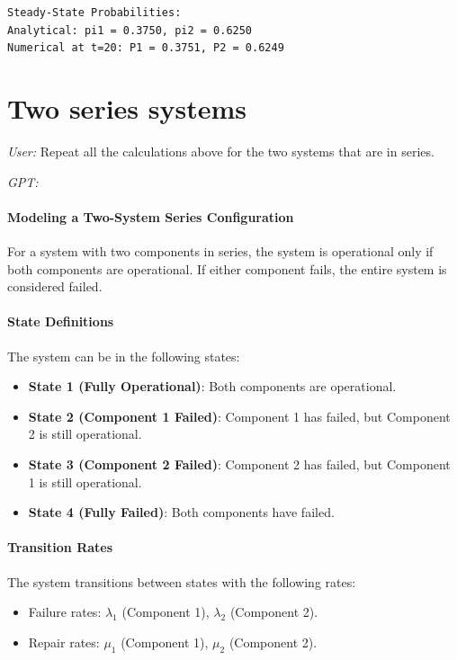 \documentclass[a4paper,12pt]{article}
\begin{document}
	

\texttt{Steady-State Probabilities:}\\
\texttt{Analytical: pi1 = 0.3750, pi2 = 0.6250}\\
\texttt{Numerical at t=20: P1 = 0.3751, P2 = 0.6249}

	
	\section{Two series systems}
	\begin{questionbox}
		\textit{User:} Repeat all the calculations above for the two systems that are in series.
	\end{questionbox}
	
	
	\begin{answerbox}
		\textit{GPT:} 
		
		\paragraph{Modeling a Two-System Series Configuration}
		For a system with two components in series, the system is operational only if both components are operational. If either component fails, the entire system is considered failed.
		
		\paragraph{State Definitions}
		The system can be in the following states:
		\begin{itemize}
			\item \textbf{State 1 (Fully Operational)}: Both components are operational.
			\item \textbf{State 2 (Component 1 Failed)}: Component 1 has failed, but Component 2 is still operational.
			\item \textbf{State 3 (Component 2 Failed)}: Component 2 has failed, but Component 1 is still operational.
			\item \textbf{State 4 (Fully Failed)}: Both components have failed.
		\end{itemize}
		
		\paragraph{Transition Rates}
		The system transitions between states with the following rates:
		\begin{itemize}
			\item Failure rates: \( \lambda_1 \) (Component 1), \( \lambda_2 \) (Component 2).
			\item Repair rates: \( \mu_1 \) (Component 1), \( \mu_2 \) (Component 2).
		\end{itemize}
		

\end{answerbox}
\end{document}

